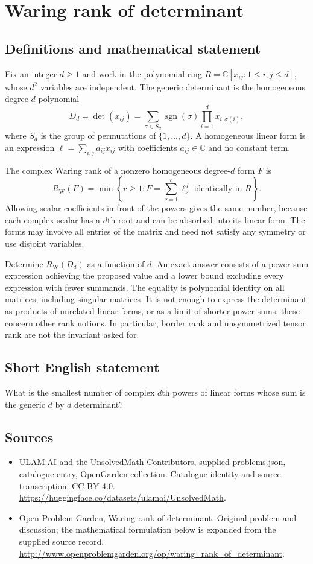 \documentclass[11pt,a4paper]{article}
\begin{document}
\section*{Waring rank of determinant}\label{statement}

\subsection{Definitions and mathematical statement}
Fix an integer $d\ge1$ and work in the polynomial ring
$R=\mathbb C[x_{ij}:1\le i,j\le d]$, whose $d^2$ variables are independent.
The generic determinant is the homogeneous degree-$d$ polynomial
\[
 D_d=\det(x_{ij})=
 \sum_{\sigma\in S_d}\operatorname{sgn}(\sigma)
       \prod_{i=1}^d x_{i,\sigma(i)},
\]
where $S_d$ is the group of permutations of $\{1,\ldots,d\}$.
A homogeneous linear form is an expression
$\ell=\sum_{i,j}a_{ij}x_{ij}$ with coefficients $a_{ij}\in\mathbb C$ and no
constant term.

The complex Waring rank of a nonzero homogeneous degree-$d$ form $F$ is
\[
 R_{\mathrm W}(F)=\min\left\{r\ge1:
 F=\sum_{\nu=1}^r\ell_\nu^d\text{ identically in }R\right\}.
\]
Allowing scalar coefficients in front of the powers gives the same number,
because each complex scalar has a $d$th root and can be absorbed into its
linear form. The forms may involve all entries of the matrix and need not
satisfy any symmetry or use disjoint variables.

Determine $R_{\mathrm W}(D_d)$ as a function of $d$. An exact answer consists
of a power-sum expression achieving the proposed value and a lower bound
excluding every expression with fewer summands. The equality is polynomial
identity on all matrices, including singular matrices. It is not enough to
express the determinant as products of unrelated linear forms, or as a
limit of shorter power sums: these concern other rank notions. In particular,
border rank and unsymmetrized tensor rank are not the invariant asked for.
\subsection{Short English statement}
What is the smallest number of complex $d$th powers of linear forms whose sum is the generic $d$ by $d$ determinant?
\subsection{Sources}
\begin{itemize}
\item[S1] ULAM.AI and the UnsolvedMath Contributors, supplied problems.json, catalogue entry, OpenGarden collection. Catalogue identity and source transcription; CC BY 4.0.
\url{https://huggingface.co/datasets/ulamai/UnsolvedMath}.
\item[S2] Open Problem Garden, Waring rank of determinant. Original problem and discussion; the mathematical formulation below is expanded from the supplied source record.
\url{http://www.openproblemgarden.org/op/waring_rank_of_determinant}.
\end{itemize}
\end{document}
